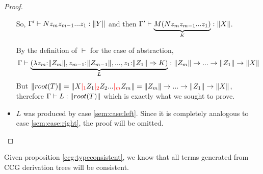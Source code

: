 \documentclass[main.tex]{subfiles}
\begin{document}
\begin{proof}
\begin{itemize}
            So, $\Gamma' \vdash N z_m z_{m - 1} ... z_1 : \|Y\|$ and then
            $\Gamma' \vdash \underbrace{M ( N z_m z_{m - 1} ... z_1 )}_{K} : \|X\|$.

            By the definition of $\vdash$ for the case of abstraction,
            \begin{equation}
                \Gamma \vdash \underbrace{(\lambda z_m {:} \|Z_m\|, z_{m - 1} {:} \|Z_{m - 1}\|, ..., z_1 {:} \|Z_1\| \Rightarrow K)}_{L} :
                \|Z_m\| \rightarrow ... \rightarrow \|Z_1\| \rightarrow \|X\|
            \end{equation}
            But $\|root(T)\| = \|X \textcolor{red}{|_{1}} Z_1 \textcolor{red}{|_{2}} Z_2 ... \textcolor{red}{|_{m}} Z_m\|
            = \|Z_m\| \rightarrow ... \rightarrow \|Z_1\| \rightarrow \|X\|$,
            therefore $\Gamma \vdash L : \|root(T)\|$ which is exactly what
            we sought to prove.
        \item $L$ was produced by case \ref{sem:case:left}. Since it is completely
            analogous to case \ref{sem:case:right}, the proof will be omitted.
    \end{itemize}
\end{proof}

Given proposition \autoref{ccg:typeconsistent}, we know that all terms generated
from CCG derivation trees will be consistent.
\end{document}
